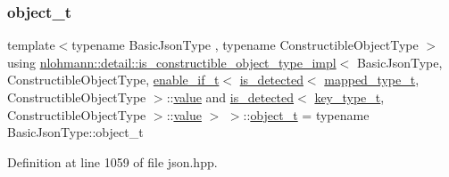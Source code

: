 \subsubsection{\texorpdfstring{object\_t}{object\_t}}
{\footnotesize\ttfamily template$<$typename Basic\+Json\+Type , typename Constructible\+Object\+Type $>$ \\
using \mbox{\hyperlink{structnlohmann_1_1detail_1_1is__constructible__object__type__impl}{nlohmann\+::detail\+::is\+\_\+constructible\+\_\+object\+\_\+type\+\_\+impl}}$<$ Basic\+Json\+Type, Constructible\+Object\+Type, \mbox{\hyperlink{namespacenlohmann_1_1detail_a02bcbc878bee413f25b985ada771aa9c}{enable\+\_\+if\+\_\+t}}$<$ \mbox{\hyperlink{namespacenlohmann_1_1detail_a9135fcf616d6ac6e231a86e0a055ac44}{is\+\_\+detected}}$<$ \mbox{\hyperlink{namespacenlohmann_1_1detail_a9c1795c148875722f8482d39e0eb9364}{mapped\+\_\+type\+\_\+t}}, Constructible\+Object\+Type $>$\+::\mbox{\hyperlink{structnlohmann_1_1detail_1_1is__constructible__object__type__impl_3_01_basic_json_type_00_01_con6e3270de8050717120afcafe87648413_a7c1801a302b938e3176435b6451962e4}{value}} and \mbox{\hyperlink{namespacenlohmann_1_1detail_a9135fcf616d6ac6e231a86e0a055ac44}{is\+\_\+detected}}$<$ \mbox{\hyperlink{namespacenlohmann_1_1detail_a66dfe39f03b05d6b7265a0ff748d64ef}{key\+\_\+type\+\_\+t}}, Constructible\+Object\+Type $>$\+::\mbox{\hyperlink{structnlohmann_1_1detail_1_1is__constructible__object__type__impl_3_01_basic_json_type_00_01_con6e3270de8050717120afcafe87648413_a7c1801a302b938e3176435b6451962e4}{value}} $>$ $>$\+::\mbox{\hyperlink{structnlohmann_1_1detail_1_1is__constructible__object__type__impl_3_01_basic_json_type_00_01_con6e3270de8050717120afcafe87648413_a6f458a63276ef62d60f4b93de03aa020}{object\+\_\+t}} =  typename Basic\+Json\+Type\+::object\+\_\+t}



Definition at line 1059 of file json.\+hpp.



